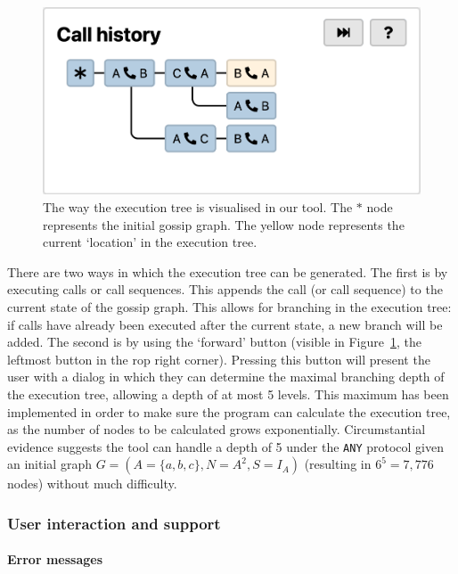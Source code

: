\begin{figure}[htb!]
    \includegraphics[width=\linewidth]{img/execution-tree.png}
    \caption{The way the execution tree is visualised in our tool. The \(*\) node represents the initial gossip graph. The yellow node represents the current `location' in the execution tree.}
    \label{fig:execution-tree}
\end{figure}

There are two ways in which the execution tree can be generated.
The first is by executing calls or call sequences.
This appends the call (or call sequence) to the current state of the gossip graph.
This allows for branching in the execution tree:
if calls have already been executed after the current state, a new branch will be added.
The second is by using the `forward' button (visible in Figure~\ref{fig:execution-tree}, the leftmost button in the rop right corner).
Pressing this button will present the user with a dialog in which they can determine the maximal branching depth of the execution tree, allowing a depth of at most 5 levels.
This maximum has been implemented in order to make sure the program can calculate the execution tree, as the number of nodes to be calculated grows exponentially.
Circumstantial evidence suggests the tool can handle a depth of 5 under the \texttt{ANY} protocol given an initial graph \(G = (A = \{a, b, c\}, N = A^2, S = I_A)\) (resulting in \(6^5 = 7,776\) nodes) without much difficulty.

\subsubsection{User interaction and support}

\paragraph{Error messages}

